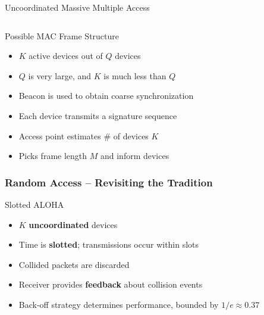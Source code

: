 \documentclass[10pt]{beamer}
\begin{document}
\begin{frame}{Uncoordinated Massive Multiple Access}
\begin{center}
  \scalebox{0.7}{}
\end{center}
\vfill
\begin{columns}
  \begin{center}
  \scalebox{0.45}{}
  \end{center}
  \begin{center}
  \scalebox{0.45}{}
  \end{center}
\end{columns}
\end{frame}


\begin{frame}{Possible MAC Frame Structure}
\begin{itemize}
\item $K$ active devices out of $Q$ devices
\item $Q$ is very large, and $K$ is much less than $Q$
\end{itemize}
\begin{center}
  \scalebox{0.8}{}
\end{center}
\begin{itemize}
\item Beacon is used to obtain coarse synchronization
\item Each device transmits a signature sequence
\item Access point estimates \# of devices $K$
\item Picks frame length $M$ and inform devices
\end{itemize}
\end{frame}


\begin{frame}
\frametitle{Random Access -- Revisiting the Tradition}
\begin{center}

\end{center}
\begin{block}{Slotted ALOHA}
  \begin{itemize}
  \item $K$ \textbf{uncoordinated} devices
  \item Time is \textbf{slotted}; transmissions occur within slots
  \item Collided packets are discarded
  \item Receiver provides \textbf{feedback} about collision events
  \item Back-off strategy determines performance, bounded by $1/e \approx 0.37$
  \end{itemize}
\end{block}
\end{frame}
\end{document}
